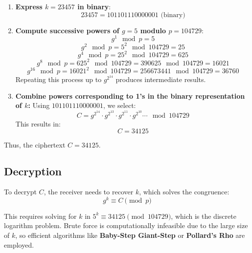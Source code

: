 \documentclass[12pt]{article}
\begin{document}
\begin{enumerate}
    \item \textbf{Express \( k = 23457 \) in binary}:
    \[
    23457 = 101101110000001 \text{ (binary)}
    \]

    \item \textbf{Compute successive powers of \( g = 5 \) modulo \( p = 104729 \)}:
    \[
    g^1 \mod p = 5
    \]
    \[
    g^2 \mod p = 5^2 \mod 104729 = 25
    \]
    \[
    g^4 \mod p = 25^2 \mod 104729 = 625
    \]
    \[
    g^8 \mod p = 625^2 \mod 104729 = 390625 \mod 104729 = 16021
    \]
    \[
    g^{16} \mod p = 16021^2 \mod 104729 = 256673441 \mod 104729 = 36760
    \]
    Repeating this process up to \( g^{2^{14}} \) produces intermediate results.

    \item \textbf{Combine powers corresponding to 1's in the binary representation of \( k \):}
    Using \( 101101110000001 \), we select:
    \[
    C = g^{2^{14}} \cdot g^{2^{13}} \cdot g^{2^{11}} \cdot g^{2^{10}} \cdots \mod 104729
    \]
    This results in:
    \[
    C = 34125
    \]
\end{enumerate}

Thus, the ciphertext \( C = 34125 \).

\subsection*{Decryption}

To decrypt \( C \), the receiver needs to recover \( k \), which solves the congruence:
\[
g^k \equiv C \pmod{p}
\]

This requires solving for \( k \) in \( 5^k \equiv 34125 \pmod{104729} \), which is the discrete logarithm problem. Brute force is computationally infeasible due to the large size of \( k \), so efficient algorithms like \textbf{Baby-Step Giant-Step} or \textbf{Pollard's Rho} are employed.
\end{document}

